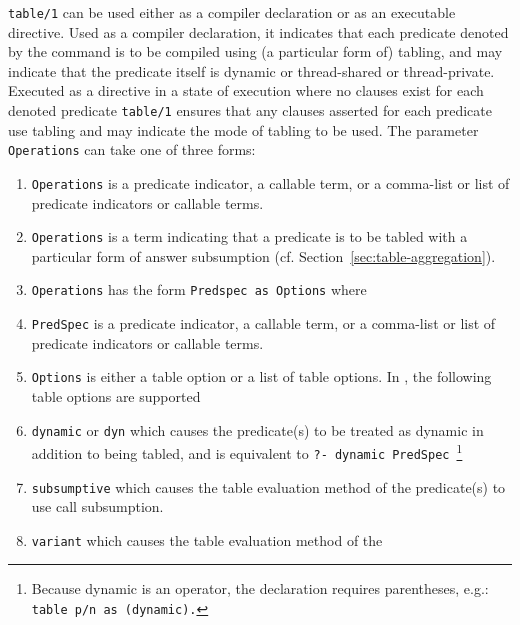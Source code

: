 \begin{description}


\label{table-declaration}
%
{\tt table/1} can be used either as a compiler declaration or as an
executable directive.  Used as a compiler declaration, it indicates
that each predicate denoted by the command is to be compiled using (a
particular form of) tabling, and may indicate that the predicate
itself is dynamic or thread-shared or thread-private.  Executed as a
directive in a state of execution where no clauses exist for each
denoted predicate {\tt table/1} ensures that any clauses asserted for
each predicate use tabling and may indicate the mode of tabling to be
used.  The parameter {\tt Operations} can take one of three forms:
%
\begin{enumerate}
\item {\tt Operations} is a predicate indicator, a callable term, or
  a comma-list or list of predicate indicators or callable terms.
%
\item {\tt Operations} is a term indicating that a predicate is to be
  tabled with a particular form of answer subsumption
  (cf. Section~\ref{sec:table-aggregation}).
%
\item {\tt Operations} has the form {\tt Predspec as Options} where
\bi
\item {\tt PredSpec} is a predicate indicator, a callable term, or a
  comma-list or list of predicate indicators or callable terms.
%
\item {\tt Options} is either a table option or a list of table
  options.  In \version, the following table options are supported
\bi
\item {\tt dynamic} or {\tt dyn} which causes the predicate(s) to be
  treated as dynamic in addition to being tabled, and is equivalent to
  {\tt ?- dynamic PredSpec}~\footnote{Because dynamic is an operator,
    the declaration requires parentheses, e.g.: {\tt table p/n as
      (dynamic).}}
%
\item {\tt subsumptive} which causes the table evaluation method of
  the predicate(s) to use call subsumption.
%
\item {\tt variant} which causes the table evaluation method of the

\end{enumerate}
\end{description}
